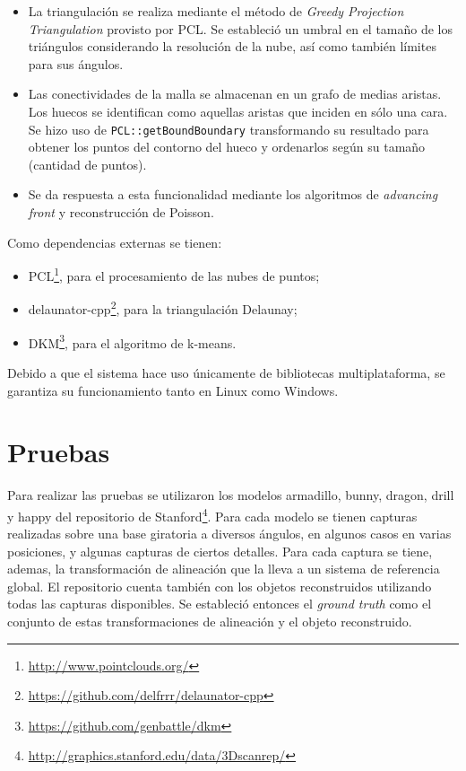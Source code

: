\begin{itemize}
			\item  {}
				La triangulación se realiza mediante el método de \emph{Greedy
				Projection Triangulation} provisto por PCL.
				Se estableció un umbral en el tamaño de los triángulos considerando la resolución de la nube,
				así como también límites para sus ángulos.

			\item  {}
				Las conectividades de la malla se almacenan en un grafo de medias aristas.
				Los huecos se identifican como aquellas aristas que inciden en sólo una cara.
				Se hizo uso de \texttt{PCL::getBoundBoundary} transformando su resultado para
				obtener los puntos del contorno del hueco y ordenarlos según su tamaño
				(cantidad de puntos).

			\item  {}
				Se da respuesta a esta funcionalidad mediante los algoritmos de \emph{advancing front} y reconstrucción de Poisson.
		\end{itemize}


		Como dependencias externas se tienen:
		\begin{itemize}
			\item PCL\footnote{\url{http://www.pointclouds.org/}},
				para el procesamiento de las nubes de puntos;
			\item delaunator-cpp\footnote{\url{https://github.com/delfrrr/delaunator-cpp}}, para la triangulación Delaunay;
			\item DKM\footnote{\url{https://github.com/genbattle/dkm}}, para el algoritmo de k-means.
		\end{itemize}
		Debido a que el sistema hace uso únicamente de bibliotecas multiplataforma,
		se garantiza su funcionamiento tanto en Linux como Windows.

	\section{Pruebas}
		Para realizar las pruebas se utilizaron los modelos
			armadillo,
			bunny,
			dragon,
			drill y
			happy del repositorio de Stanford\footnote{\url{http://graphics.stanford.edu/data/3Dscanrep/}}.
		Para cada modelo se tienen capturas realizadas sobre una base giratoria
		a diversos ángulos, en algunos casos en varias posiciones, y
		algunas capturas de ciertos detalles.
		Para cada captura se tiene, ademas, la transformación de alineación que
		la lleva a un sistema de referencia global.
		El repositorio cuenta también con los objetos reconstruidos utilizando
		todas las capturas disponibles.
		Se estableció entonces el \emph{ground truth} como el conjunto de estas
		transformaciones de alineación y el objeto reconstruido.

